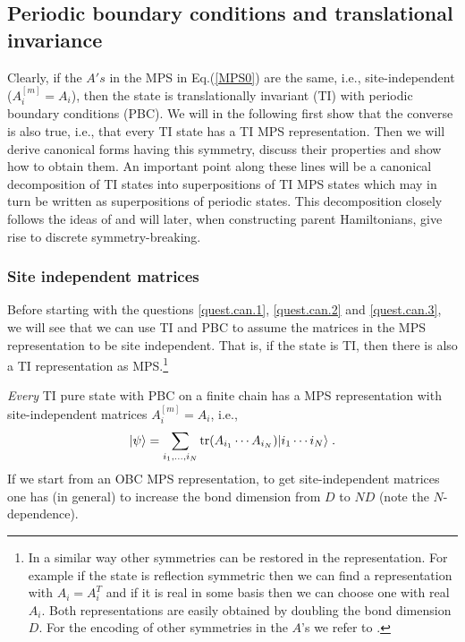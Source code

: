 \documentclass[aps,prl,epsfig,graphics,floatfix,mathbbm,a4paper]{article}
\newcommand{\1}{\mathbbm{1}}
\renewcommand{\>}{\rangle}
\newcommand{\<}{\langle}
\begin{document}

\subsection{Periodic boundary conditions and translational invariance}

Clearly, if the $A's$ in the MPS in Eq.(\ref{MPS0}) are the same,
i.e., site-independent ($A_i^{[m]}=A_i$), then the state is
translationally invariant (TI) with periodic boundary conditions
(PBC). We will in the following first show that the converse is
also true, i.e., that every TI state has a TI MPS representation.
Then we will derive canonical forms having this symmetry, discuss
their properties and show how to obtain them. An important point
along these lines will be a canonical decomposition of TI states
into superpositions of TI MPS states which may in turn be written
as superpositions of periodic states. This decomposition closely
follows the ideas of \cite{FaNaWe92} and will later, when
constructing parent Hamiltonians, give rise to discrete
symmetry-breaking.

\subsubsection{Site independent matrices}

Before starting with the questions \ref{quest.can.1},
\ref{quest.can.2} and \ref{quest.can.3}, we will see that we can
use TI and PBC to assume the matrices in the MPS representation to
be site independent. That is, if the state is TI, then there is
also a TI representation as MPS.\footnote{In a similar way other
    symmetries can be restored in the representation. For example if
    the state is reflection symmetric then we can find a
    representation with $A_i=A_i^T$ and if it is real in some basis
    then we can choose one with real $A_i$. Both representations are
    easily obtained by doubling the bond dimension $D$. For the
    encoding of other symmetries in the $A$'s we refer to
    \cite{FaNaWe92,NachtergaeleSym,Ortiz}.}

\begin{theorem}
    {\it Every} TI pure state with PBC on a finite chain has a MPS
    representation with site-independent matrices $A_i^{[m]}=A_i$,
    i.e.,\begin{equation}\label{eq.1}
        |\psi\rangle=\sum_{i_1,\ldots,i_N} \operatorname{tr}(A_{i_1}\cdots
        A_{i_N})|i_1\cdots i_N\rangle\;.
    \end{equation}
    If we start from an OBC MPS representation, to get
    site-independent matrices one has (in general) to increase the
    bond dimension from $D$ to $ND$ (note the $N$-dependence).
\end{theorem}
\end{document}
